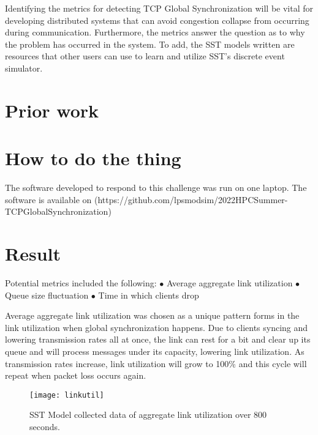 \documentclass{article}
\begin{document}
Identifying the metrics for detecting TCP Global Synchronization will be vital for developing distributed systems that can avoid congestion collapse from occurring during communication. Furthermore, the metrics answer the question as to why the problem has occurred in the system. To add, the SST models written are resources that other users can use to learn and utilize SST's discrete event simulator.

\section{Prior work} %



\section{How to do the thing}

The software developed to respond to this challenge was run on one laptop.
The software is available on (https://github.com/lpsmodsim/2022HPCSummer-TCPGlobalSynchronization)

\section{Result} %

Potential metrics included the following:\newline
	$\bullet$ Average aggregate link utilization \newline
	$\bullet$ Queue size fluctuation \newline
	$\bullet$ Time in which clients drop \newline\newline

	Average aggregate link utilization was chosen as a unique pattern forms in the link utilization when global synchronization happens. Due to clients syncing and lowering transmission rates all at once, the link can rest for a bit and clear up its queue and will process messages under its capacity, lowering link utilization. As transmission rates increase, link utilization will grow to 100\% and this cycle will repeat when packet loss occurs again.\newline
	
	\begin{figure}[H]
	\caption{SST Model collected data of aggregate link utilization over 800 seconds.}
	\centering
	\texttt{[image: linkutil]}
	\end{figure}
	
\end{document}
